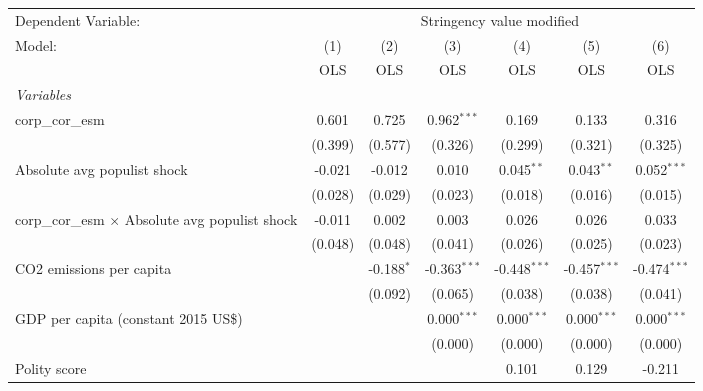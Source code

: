 
\begingroup
\centering
\begin{tabular}{lcccccc}
   \toprule
   Dependent Variable: & \multicolumn{6}{c}{Stringency value modified}\\
   Model:                                                 & (1)     & (2)          & (3)            & (4)            & (5)            & (6)\\  
                                                          &  OLS    & OLS          & OLS            & OLS            & OLS            & OLS\\  
   \midrule
   \emph{Variables}\\
   corp\_cor\_esm                                         & 0.601   & 0.725        & 0.962$^{***}$  & 0.169          & 0.133          & 0.316\\   
                                                          & (0.399) & (0.577)      & (0.326)        & (0.299)        & (0.321)        & (0.325)\\   
   Absolute avg populist shock                            & -0.021  & -0.012       & 0.010          & 0.045$^{**}$   & 0.043$^{**}$   & 0.052$^{***}$\\   
                                                          & (0.028) & (0.029)      & (0.023)        & (0.018)        & (0.016)        & (0.015)\\   
   corp\_cor\_esm $\times$ Absolute avg populist shock    & -0.011  & 0.002        & 0.003          & 0.026          & 0.026          & 0.033\\   
                                                          & (0.048) & (0.048)      & (0.041)        & (0.026)        & (0.025)        & (0.023)\\   
   CO2 emissions per capita                               &         & -0.188$^{*}$ & -0.363$^{***}$ & -0.448$^{***}$ & -0.457$^{***}$ & -0.474$^{***}$\\   
                                                          &         & (0.092)      & (0.065)        & (0.038)        & (0.038)        & (0.041)\\   
   GDP per capita (constant 2015 US\$)                    &         &              & 0.000$^{***}$  & 0.000$^{***}$  & 0.000$^{***}$  & 0.000$^{***}$\\   
                                                          &         &              & (0.000)        & (0.000)        & (0.000)        & (0.000)\\   
   Polity score                                           &         &              &                & 0.101          & 0.129          & -0.211\\   

\end{tabular}
